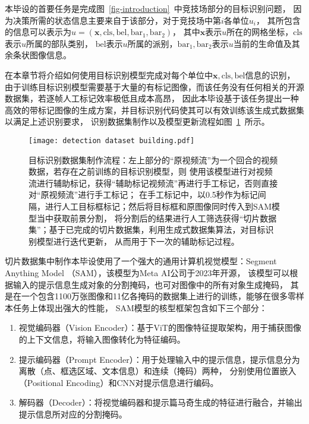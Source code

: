 
本毕设的首要任务是完成图~\ref{fig-introduction}~中竞技场部分的目标识别问题，
因为决策所需的状态信息主要来自于该部分，对于竞技场中第$i$各单位$u_i$，
其所包含的信息可以表示为$u=(\boldsymbol{x}, \text{cls}, \text{bel}, \text{bar}_1, \text{bar}_2)$，
其中$\boldsymbol{x}$表示$u$所在的网格坐标，$\text{cls}$表示$u$所属的部队类别，
$\text{bel}$表示$u$所属的派别，$\text{bar}_1,\text{bar}_2$表示$u$当前的生命值及其余条状图像信息。

在本章节将介绍如何使用目标识别模型完成对每个单位中$\boldsymbol{x}, \text{cls}, \text{bel}$信息的识别，
由于训练目标识别模型需要基于大量的有标记图像，而该任务没有任何相关的开源数据集，若逐帧人工标记效率极低且成本高昂，
因此本毕设基于该任务提出一种高效的带标记图像的生成方案，并目标识别代码使其可以有效训练该生成式数据集以满足上述识别要求，
识别数据集制作以及模型更新流程如图~\ref{fig-annotation}~所示。
\begin{figure}[htbp]
  \centering
  \texttt{[image: detection dataset building.pdf]}
  \caption{目标识别数据集制作流程：左上部分的“原视频流”为一个回合的视频数据，若存在之前训练的目标识别模型，则
  使用该模型进行对视频流进行辅助标记，获得“辅助标记视频流”再进行手工标记，否则直接对“原视频流”进行手工标记；
  在手工标记中，以0.5秒作为标记间隔，进行人工目标框标记；然后将目标框和原图像同时传入到SAM模型当中获取前景分割，
  将分割后的结果进行人工筛选获得“切片数据集”；基于已完成的切片数据集，利用生成式数据集算法，对目标识别模型进行迭代更新，
  从而用于下一次的辅助标记过程。}
  \label{fig-annotation}
\end{figure}

切片数据集中制作本毕设使用了一个强大的通用计算机视觉模型：Segment Anything Model （SAM），该模型为Meta AI公司于2023年开源，
该模型可以根据输入的提示信息生成对象的分割掩码，也可对图像中的所有对象生成掩码，
其是在一个包含1100万张图像和11亿各掩码的数据集上进行的训练，能够在很多零样本任务上体现出强大的性能，
SAM模型的核型框架包含如下三个部分：
\begin{enumerate}
  \item 视觉编码器（Vision Encoder）：基于ViT的图像特征提取架构，用于捕获图像的上下文信息，将输入图像转化为特征编码。
  \item 提示编码器（Prompt Encoder）：用于处理输入中的提示信息，提示信息分为离散（点、框选区域、文本信息）和连续（掩码）两种，
  分别使用位置嵌入（Positional Encoding）和CNN对提示信息进行编码。
  \item 解码器（Decoder）：将视觉编码器和提示篇马奇生成的特征进行融合，并输出提示信息所对应的分割掩码。
\end{enumerate}

